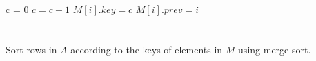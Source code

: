 \documentclass[11]{Report}
\begin{document}
\section*{}

\begin{algorithmic}
    
   		\State c = 0
			\State $c = c + 1$  
		\EndWhile
		\State $M[i].key = c$
		\State $M[i].prev = i$
	\EndFor

\EndFunction
\end{algorithmic}

\section*{}

\begin{algorithmic}

Sort rows in $A$ according to the keys of elements in $M$ using merge-sort.

\EndFunction
\end{algorithmic}
\end{document}
